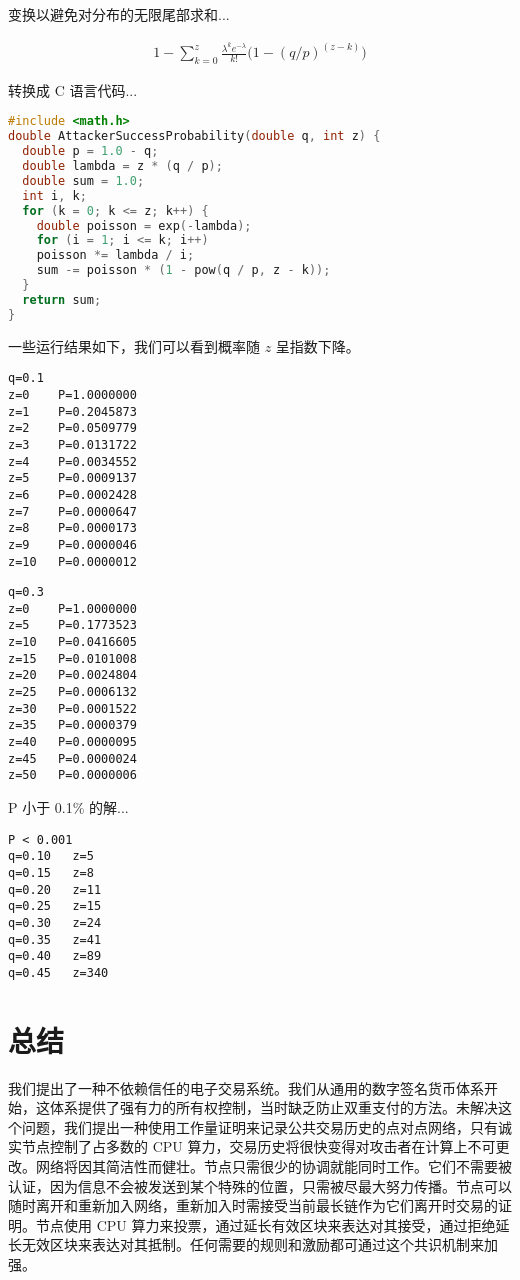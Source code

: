 \documentclass{article}
\begin{document}
变换以避免对分布的无限尾部求和...

\begin{align*}
 1-
 \sum_{k = 0}^{z}
 \frac{\lambda^ke^{-\lambda}}{k!}
 \big(1 - (q / p)^{(z - k)}\big)
\end{align*}

转换成 C 语言代码...

\begin{lstlisting}[language=C]
#include <math.h>
double AttackerSuccessProbability(double q, int z) {
  double p = 1.0 - q;
  double lambda = z * (q / p);
  double sum = 1.0;
  int i, k;
  for (k = 0; k <= z; k++) {
    double poisson = exp(-lambda);
    for (i = 1; i <= k; i++)
    poisson *= lambda / i;
    sum -= poisson * (1 - pow(q / p, z - k));
  }
  return sum;
}
\end{lstlisting}

一些运行结果如下，我们可以看到概率随 $z$ 呈指数下降。

\begin{lstlisting}
q=0.1
z=0    P=1.0000000
z=1    P=0.2045873
z=2    P=0.0509779
z=3    P=0.0131722
z=4    P=0.0034552
z=5    P=0.0009137
z=6    P=0.0002428
z=7    P=0.0000647
z=8    P=0.0000173
z=9    P=0.0000046
z=10   P=0.0000012
\end{lstlisting}

\begin{lstlisting}
q=0.3
z=0    P=1.0000000
z=5    P=0.1773523
z=10   P=0.0416605
z=15   P=0.0101008
z=20   P=0.0024804
z=25   P=0.0006132
z=30   P=0.0001522
z=35   P=0.0000379
z=40   P=0.0000095
z=45   P=0.0000024
z=50   P=0.0000006
\end{lstlisting}

P 小于 0.1\% 的解...
\begin{lstlisting}
P < 0.001
q=0.10   z=5
q=0.15   z=8
q=0.20   z=11
q=0.25   z=15
q=0.30   z=24
q=0.35   z=41
q=0.40   z=89
q=0.45   z=340
\end{lstlisting}

\section{总结}

我们提出了一种不依赖信任的电子交易系统。我们从通用的数字签名货币体系开始，这体系提供了强有力的所有权控制，当时缺乏防止双重支付的方法。未解决这个问题，我们提出一种使用工作量证明来记录公共交易历史的点对点网络，只有诚实节点控制了占多数的 CPU 算力，交易历史将很快变得对攻击者在计算上不可更改。网络将因其简洁性而健壮。节点只需很少的协调就能同时工作。它们不需要被认证，因为信息不会被发送到某个特殊的位置，只需被尽最大努力传播。节点可以随时离开和重新加入网络，重新加入时需接受当前最长链作为它们离开时交易的证明。节点使用 CPU 算力来投票，通过延长有效区块来表达对其接受，通过拒绝延长无效区块来表达对其抵制。任何需要的规则和激励都可通过这个共识机制来加强。
\end{document}
